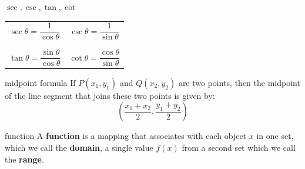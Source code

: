 \documentclass[avery5371,grid]{flashcards}
\begin{document}
\begin{flashcard}[Definition]{$\sec, \csc, \tan, \cot$}
\begin{center}
\begin{tabular}{cc}
$\sec \theta = \dfrac{1}{\cos \theta}$ &
$\csc \theta = \dfrac{1}{\sin \theta}$\\
 & \\
 & \\
$\tan \theta = \dfrac{\sin \theta}{\cos \theta}$ &
$\cot \theta = \dfrac{\cos \theta}{\sin \theta}$\\
\end{tabular} 
\end{center}
\end{flashcard}

\begin{flashcard}[Definition]{midpoint formula}
If $P(x_{1}, y_{1})$ and $Q(x_{2}, y_{2})$ are two points, then 
the midpoint of the line segment that joins these two points
is given by:
\begin{equation*}
\left( \dfrac{x_{1}+x_{2}}{2}, \dfrac{y_{1}+y_{2}}{2}\right) 
\end{equation*}
\end{flashcard}

\begin{flashcard}[Definition]{function}
A \textbf{function} is a mapping that associates with each object $x$ in one
set, which we call the \textbf{domain}, a single value $f(x)$ from a second set
which we call the \textbf{range}.
\end{flashcard}

\begin{flashcard}[]{}

\end{flashcard}

\begin{flashcard}[]{}

\end{flashcard}
\end{document}
